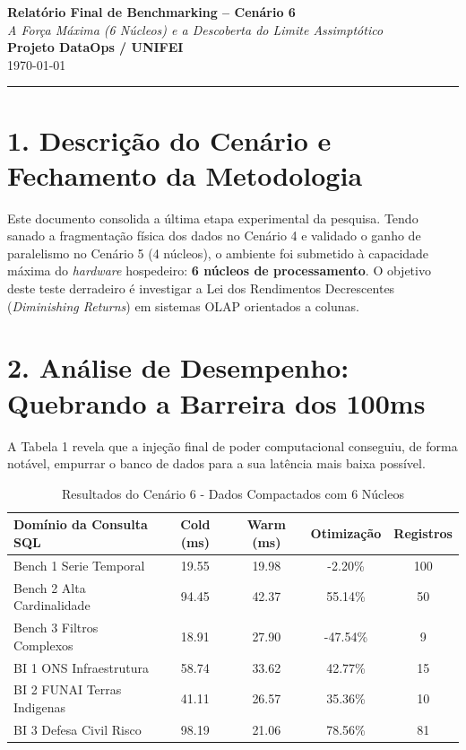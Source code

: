 \documentclass[12pt, a4paper]{article}
\begin{document}
\begin{center}
    \Large\textbf{Relatório Final de Benchmarking -- Cenário 6} \\[0.2cm]
    \large\textit{A Força Máxima (6 Núcleos) e a Descoberta do Limite Assimptótico} \\[0.5cm]
    \normalsize\textbf{Projeto DataOps / UNIFEI} \\
    \small{\today}
\end{center}

\vspace{0.5cm}
\noindent\rule{\textwidth}{1pt}

\section*{1. Descrição do Cenário e Fechamento da Metodologia}
Este documento consolida a última etapa experimental da pesquisa. Tendo sanado a fragmentação física dos dados no Cenário 4 e validado o ganho de paralelismo no Cenário 5 (4 núcleos), o ambiente foi submetido à capacidade máxima do \textit{hardware} hospedeiro: \textbf{6 núcleos de processamento}. O objetivo deste teste derradeiro é investigar a Lei dos Rendimentos Decrescentes (\textit{Diminishing Returns}) em sistemas OLAP orientados a colunas.

\section*{2. Análise de Desempenho: Quebrando a Barreira dos 100ms}
A Tabela 1 revela que a injeção final de poder computacional conseguiu, de forma notável, empurrar o banco de dados para a sua latência mais baixa possível. 

\begin{table}[H]
\centering
\caption{Resultados do Cenário 6 - Dados Compactados com 6 Núcleos}
\vspace{0.2cm}
\begin{tabular}{@{}lcccc@{}}
\toprule
\textbf{Domínio da Consulta SQL} & \textbf{Cold (ms)} & \textbf{Warm (ms)} & \textbf{Otimização} & \textbf{Registros} \\
\midrule
    Bench 1 Serie Temporal & 19.55 & 19.98 & -2.20\% & 100 \\
    Bench 2 Alta Cardinalidade & 94.45 & 42.37 & 55.14\% & 50 \\
    Bench 3 Filtros Complexos & 18.91 & 27.90 & -47.54\% & 9 \\
    BI 1 ONS Infraestrutura & 58.74 & 33.62 & 42.77\% & 15 \\
    BI 2 FUNAI Terras Indigenas & 41.11 & 26.57 & 35.36\% & 10 \\
    BI 3 Defesa Civil Risco & 98.19 & 21.06 & 78.56\% & 81 \\

\bottomrule
\end{tabular}
\end{table}
\end{document}
